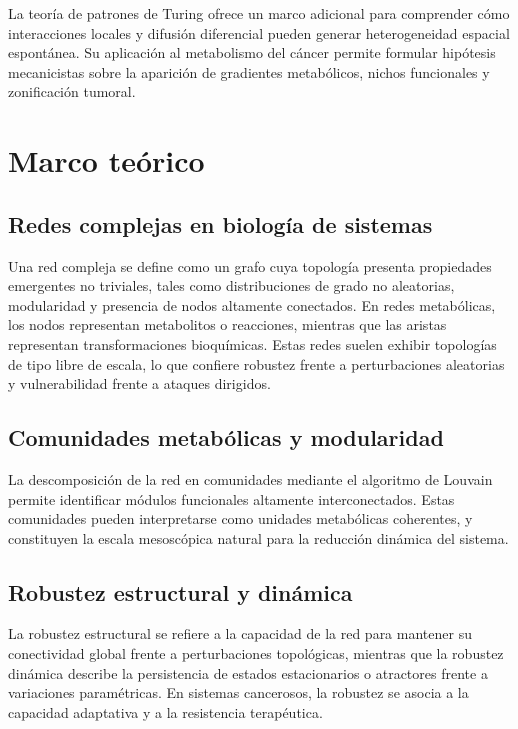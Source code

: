 \documentclass[12pt,spanish]{article}
\begin{document}
	La teoría de patrones de Turing ofrece un marco adicional para comprender cómo interacciones locales y difusión diferencial pueden generar heterogeneidad espacial espontánea. Su aplicación al metabolismo del cáncer permite formular hipótesis mecanicistas sobre la aparición de gradientes metabólicos, nichos funcionales y zonificación tumoral.
	
	\section{Marco teórico}
	
	\subsection{Redes complejas en biología de sistemas}
	
	Una red compleja se define como un grafo cuya topología presenta propiedades emergentes no triviales, tales como distribuciones de grado no aleatorias, modularidad y presencia de nodos altamente conectados. En redes metabólicas, los nodos representan metabolitos o reacciones, mientras que las aristas representan transformaciones bioquímicas. Estas redes suelen exhibir topologías de tipo libre de escala, lo que confiere robustez frente a perturbaciones aleatorias y vulnerabilidad frente a ataques dirigidos.
	
	\subsection{Comunidades metabólicas y modularidad}
	
	La descomposición de la red en comunidades mediante el algoritmo de Louvain permite identificar módulos funcionales altamente interconectados. Estas comunidades pueden interpretarse como unidades metabólicas coherentes, y constituyen la escala mesoscópica natural para la reducción dinámica del sistema.
	
	\subsection{Robustez estructural y dinámica}
	
	La robustez estructural se refiere a la capacidad de la red para mantener su conectividad global frente a perturbaciones topológicas, mientras que la robustez dinámica describe la persistencia de estados estacionarios o atractores frente a variaciones paramétricas. En sistemas cancerosos, la robustez se asocia a la capacidad adaptativa y a la resistencia terapéutica.
	
\end{document}
